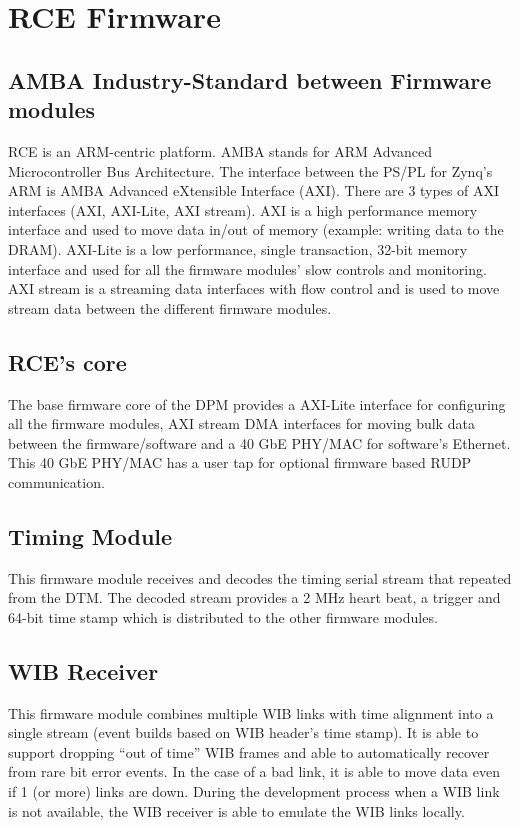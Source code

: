 \section{RCE Firmware}
\label{sec:firmware}
\subsection{AMBA Industry-Standard between Firmware modules}
RCE is an ARM-centric platform. AMBA stands for ARM Advanced Microcontroller Bus Architecture. The interface between the PS/PL for Zynq’s ARM is AMBA Advanced eXtensible Interface (AXI). There are 3 types of AXI interfaces (AXI, AXI-Lite, AXI stream). AXI is a high performance memory interface and used to move data in/out of memory (example: writing data to the DRAM). AXI-Lite is a low performance, single transaction, 32-bit memory interface and used for all the firmware modules' slow controls and monitoring. AXI stream is a streaming data interfaces with flow control and is used to move stream data between the different firmware modules.

\subsection{RCE's core}
The base firmware core of the DPM provides a AXI-Lite interface for configuring all the firmware modules, AXI stream DMA interfaces for moving bulk data between the firmware/software and a 40 GbE PHY/MAC for software's Ethernet.  This 40 GbE PHY/MAC has a user tap for optional firmware based RUDP communication.

\subsection{Timing Module}
This firmware module receives and decodes the  timing serial stream that repeated from the DTM.  The decoded stream provides a 2 MHz heart beat, a trigger and 64-bit time stamp which is distributed to the other firmware modules.

\subsection{WIB Receiver}
This firmware module combines multiple WIB links with time alignment into a single stream (event builds based on WIB header’s time stamp). It is able to support dropping “out of time” WIB frames and able to automatically recover from rare bit error events. In the case of a bad link, it is able to move data even if 1 (or more) links are down.  During the development process when a WIB link is not available, the WIB receiver is able to emulate the WIB links locally.

